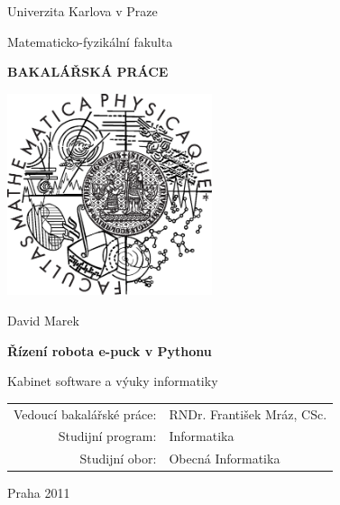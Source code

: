 

\pagestyle{empty}
\begin{center}

\large

Univerzita Karlova v Praze

\medskip

Matematicko-fyzikální fakulta

\vfill

{\bf\Large BAKALÁŘSKÁ PRÁCE}

\vfill

\centerline{\mbox{\includegraphics[width=60mm]{img/logo.eps}}}

\vfill
\vspace{5mm}

{\LARGE David Marek}

\vspace{15mm}

{\LARGE\bfseries Řízení robota e-puck v Pythonu}

\vfill

Kabinet software a výuky informatiky

\vfill

\begin{tabular}{rl}

Vedoucí bakalářské práce: & RNDr. František Mráz, CSc.\\
\noalign{\vspace{2mm}}
Studijní program: & Informatika \\
\noalign{\vspace{2mm}}
Studijní obor: & Obecná Informatika \\
\end{tabular}

\vfill

Praha 2011

\end{center}

